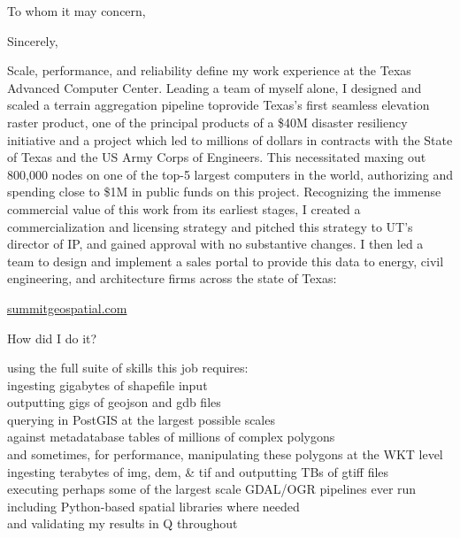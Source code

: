\documentclass[letterpaper,10pt,colorlinks,linkcolor=cyan]{moderncv}
\begin{document}
  \hypersetup{urlcolor=links}
  \makecvtitle
  \date{December 6, 2023}
  \opening{To whom it may concern,}
  \closing{Sincerely,}
%
Scale, performance, and reliability define my work experience at the Texas Advanced Computer Center. 
Leading a team of myself alone, I designed and scaled a terrain aggregation pipeline toprovide Texas's first seamless elevation raster product, one of the principal products of a \$40M disaster resiliency initiative and a project which led to millions of dollars in contracts with the State of Texas and the US Army Corps of Engineers.
This necessitated maxing out 800,000 nodes on one of the top-5 largest computers in the world, authorizing and spending close to \$1M in public funds on this project. 
Recognizing the immense commercial value of this work from its earliest stages, I created a commercialization and licensing strategy and pitched this strategy to UT's director of IP, and gained approval with no substantive changes. 
I then led a team to design and implement a sales portal to provide this data to energy, civil engineering, and architecture firms across the state of Texas:

\href{https://summitgeospatial.com}{summitgeospatial.com}

How did I do it?

using the full suite of skills this job requires:\\
\faHandPointRight[regular] ingesting gigabytes of shapefile input\\
\faHandPointRight[regular] outputting gigs of geojson and gdb files\\
\faHandPointRight[regular] querying in PostGIS at the largest possible scales\\
\faHandPointRight[regular] against metadatabase tables of millions of complex polygons\\
\faHandPointRight[regular] and sometimes, for performance, manipulating these polygons at the WKT level\\
\faHandPointRight[regular] ingesting terabytes of img, dem, \& tif and outputting TBs of gtiff files\\
\faHandPointRight[regular] executing perhaps some of the largest scale GDAL/OGR pipelines ever run\\
\faHandPointRight[regular] including Python-based spatial libraries where needed\\
\faHandPointRight[regular] and validating my results in Q throughout
\end{document}
